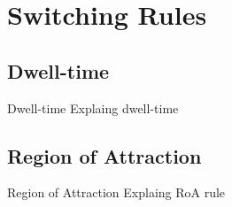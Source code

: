 
\section{Switching Rules}%
\label{sec:switching-rules}

\subsection{Dwell-time}%
\label{subsec:dwell-time}

\begin{slide}{Dwell-time}
  \vspace*{\fill}
  Explaing dwell-time
  \vspace*{\fill}
\end{slide}

\subsection{Region of Attraction}%
\label{subsec:roa-rule}

\begin{slide}{Region of Attraction}
  \vspace*{\fill}
  Explaing RoA rule
  \vspace*{\fill}
\end{slide}
